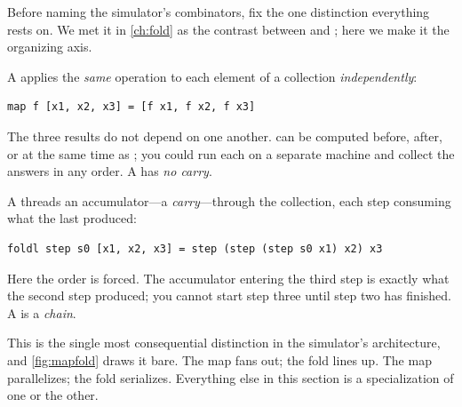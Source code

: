 Before naming the simulator's combinators, fix the one distinction everything
rests on. We met it in \cref{ch:fold} as the contrast between  and
; here we make it the organizing axis.

A  applies the \emph{same} operation to each element of a collection
\emph{independently}:
\begin{lstlisting}[style=l4style]
map f [x1, x2, x3] = [f x1, f x2, f x3]
\end{lstlisting}
The three results do not depend on one another.  can be computed before,
after, or at the same time as ; you could run each on a separate
machine and collect the answers in any order. A  has \emph{no carry}.

A  threads an accumulator---a \emph{carry}---through the collection,
each step consuming what the last produced:
\begin{lstlisting}[style=l4style]
foldl step s0 [x1, x2, x3] = step (step (step s0 x1) x2) x3
\end{lstlisting}
Here the order is forced. The accumulator entering the third step is exactly what
the second step produced; you cannot start step three until step two has finished.
A  is a \emph{chain}.

This is the single most consequential distinction in the simulator's architecture,
and \cref{fig:mapfold} draws it bare. The map fans out; the fold lines up. The map
parallelizes; the fold serializes. Everything else in this section is a
specialization of one or the other.

